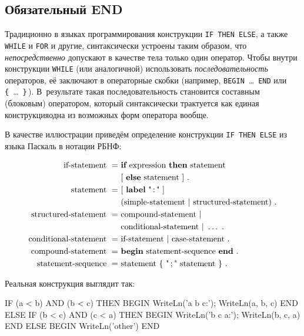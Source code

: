 \documentclass[utf8]{lgu}
\newcommand{\tire}{\unskip\nobreak\thinspace\textemdash\thinspace}
\newcommand{\code}[1]{{\normalsize\texttt{#1}}}
\begin{document}
\subsection{Обязательный END}

\firstparskip Традиционно в языках программирования конструкции \code{IF THEN ELSE}, а также \code{WHILE} и \code{FOR} и другие, синтаксически устроены таким образом, что \textit{непосредственно} допускают в качестве тела только один оператор. Чтобы внутри конструкции \code{WHILE} (или аналогичной) использовать \textit{последовательность} операторов, её заключают в операторные скобки (например, \code{BEGIN}~\ldots~\code{END} или \code{\{}~\ldots~\code{\}}\,). В~результате такая последовательность становится составным (блоковым) оператором, который синтаксически трактуется как единая конструкция\tire одна из возможных форм оператора вообще.

В качестве иллюстрации приведём определение конструкции \code{IF THEN ELSE} из языка Паскаль в нотации РБНФ:

{\small\begin{align*}
  \text{if-statement}\ =\ &\textbf{if}\ \text{expression}\ \textbf{then}\ \text{statement} \\
  & [\ \textbf{else}\ \text{statement}\ ]\ .\\
  \text{statement}\ =\ &[\ \textbf{label}\ \text{"\,:\,"}\ ] \\
  & (\text{simple-statement}\ |\ \text{structured-statement})\ .\\
  \text{structured-statement}\ =\ &\text{compound-statement}\ | \\
  & \text{conditional-statement}\ |\ \ldots\ .\\
  \text{conditional-statement}\ =\ &\text{if-statement}\ |\ \text{case-statement}\ .\\
  \text{compound-statement}\ =\ &\textbf{begin}\ \text{statement-sequence}\ \textbf{end}\ .\\
  \text{statement-sequence}\ =\ &\text{statement}\ \{\ \text{"\,;\,"}\ \text{statement}\ \}\ .
\end{align*}}

\noindent Реальная конструкция выглядит так:

\begin{listing}[H]
\caption{Пример конструкции IF THEN ELSE на языке Паскаль}
\vspace{-17pt}
\begin{pascal}
IF (a < b) AND (b < c) THEN BEGIN
  WriteLn('a b c:');
  WriteLn(a, b, c)
END ELSE IF (b < c) AND (c < a) THEN BEGIN
  WriteLn('b c a:');
  WriteLn(b, c, a)
END ELSE BEGIN
  WriteLn('other')
END
\end{pascal}
\end{listing}
\end{document}
